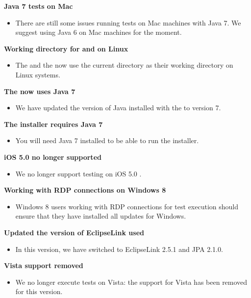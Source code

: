 \textbf{Java 7 tests on Mac}
\begin{itemize}
\item There are still some issues running tests on Mac machines with Java 7. We suggest using Java 6 on Mac machines for the moment.
\end{itemize}

\textbf{Working directory for \ite{} and \gdagent{} on Linux}
\begin{itemize}
\item The \gdagent{} and the \ite{} now  use the current directory as their working directory on Linux systems.
\end{itemize}


\textbf{The \ite{} now uses Java 7}
\begin{itemize}
\item We have updated the version of Java installed with the \ite{} to version 7.
\end{itemize}

\textbf{The installer requires Java 7}
\begin{itemize}
\item You will need Java 7 installed to be able to run the installer.
\end{itemize}

\textbf{iOS 5.0 no longer supported}
\begin{itemize}
\item We no longer support testing on iOS 5.0 \gdauts{}.
\end{itemize}

\textbf{Working with RDP connections on Windows 8}
\begin{itemize}
\item Windows 8 users working with RDP connections for test execution should ensure that they have installed all updates for Windows. 
\end{itemize}

\textbf{Updated the version of EclipseLink used}
\begin{itemize}
\item In this version, we have switched to EclipseLink 2.5.1 and JPA 2.1.0.
\end{itemize}

\textbf{Vista support removed}
\begin{itemize}
\item We no longer execute tests on Vista: the support for Vista has been removed for this version.
\end{itemize}

